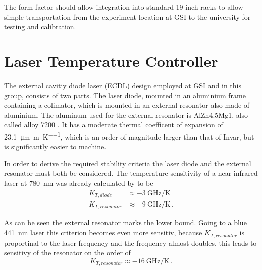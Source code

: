 The form factor should allow integration into standard 19-inch racks to allow simple transportation from the experiment location at GSI to the university for testing and calibration.

\clearpage
\section{Laser Temperature Controller}%
\label{sec:laser_temperatrure_controller}
The external cavitiy diode laser (ECDL) design employed at GSI and in this group, consists of two parts. The laser diode, mounted in an aluminium frame containing a colimator, which is mounted in an external resonator also made of aluminium. The aluminum used for the external resonator is AlZn4.5Mg1, also called alloy 7200 \cite{datasheet_laser_alu}. It has a moderate thermal coefficent of expansion of \qty{23.1}{\micro \meter \per \m \per \K}, which is an order of magnitude larger than that of Invar, but is significantly easier to machine.

In order to derive the required stability criteria the laser diode and the external resonator must both be considered. The temperature sensitivity of a near-infrared laser at \qty{780}{\nm} was already calculated by \citeauthor{thesis_tilman} \cite{thesis_tilman} to be
\begin{align*}
    K_{T,diode} &\approx \qty{-3}{\GHz \per \K}\\
    K_{T,resonator} &\approx \qty{-9}{\GHz \per \K}\,.
\end{align*}

As can be seen the external resonator marks the lower bound. Going to a blue \qty{441}{\nm} laser this criterion becomes even more sensitiv, because $K_{T,resonator}$ is proportinal to the laser frequency and the frequency almost doubles, this leads to sensitivy of the resonator on the order of
\begin{equation}
    K_{T,resonator} \approx \qty{-16}{\GHz \per \K}\,.
\end{equation}

